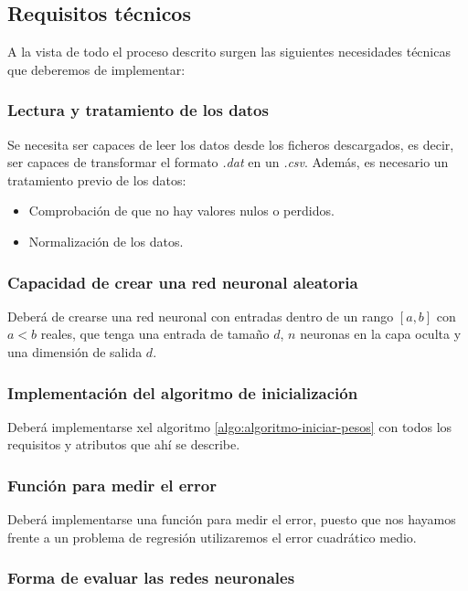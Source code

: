 \subsection{Requisitos técnicos}  

A la vista de todo el proceso descrito surgen las siguientes necesidades técnicas que deberemos de implementar:  

\subsubsection{Lectura y tratamiento de los datos}

Se necesita ser capaces de leer los datos desde los ficheros descargados, es decir, ser capaces de transformar el formato \textit{.dat} en un \textit{.csv}. 
Además, es necesario un tratamiento previo de los datos: 
\begin{itemize}
    \item Comprobación de que no hay valores nulos o perdidos. 
    \item Normalización de los datos. 
\end{itemize}


\subsubsection{Capacidad de crear una red neuronal aleatoria}  

Deberá de crearse una red neuronal con entradas dentro de un rango $[a,b]$ con $a < b$ reales,
que tenga una entrada de tamaño $d$,
$n$ neuronas en la capa oculta y
una dimensión de salida $d$.

\subsubsection{Implementación del algoritmo de inicialización}

Deberá implementarse xel algoritmo  \ref{algo:algoritmo-iniciar-pesos} con todos los requisitos y atributos que ahí se describe.  

\subsubsection{Función para medir el error}

Deberá implementarse una función para medir el
 error, puesto que nos hayamos frente a un problema de regresión utilizaremos el error cuadrático medio. 

\subsubsection{Forma de evaluar las redes neuronales}  

